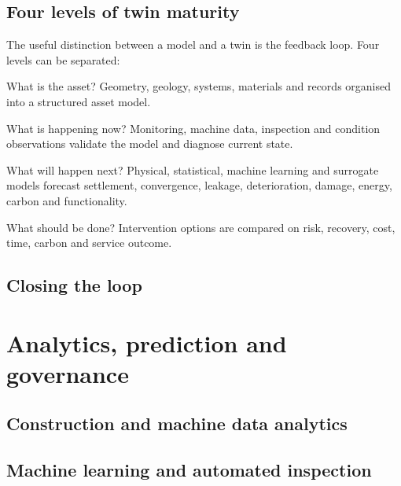 \subsection{Four levels of twin maturity}
\label{sec:twin-maturity}
The useful distinction between a model and a twin is the feedback loop. Four
levels can be separated:

\begin{description}[leftmargin=28mm,style=nextline,nosep]
  \item[Descriptive] What is the asset? Geometry, geology, systems, materials
    and records organised into a structured asset model.
  \item[Reflective] What is happening now? Monitoring, machine data, inspection
    and condition observations validate the model and diagnose current state.
  \item[Predictive] What will happen next? Physical, statistical, machine
    learning and surrogate models forecast settlement, convergence, leakage,
    deterioration, damage, energy, carbon and functionality.
  \item[Prescriptive] What should be done? Intervention options are compared on
    risk, recovery, cost, time, carbon and service outcome.
\end{description}

\subsection{Closing the loop}
\label{sec:twin-loop}

\section{Analytics, prediction and governance}
\label{sec:analytics-and-governance}

\subsection{Construction and machine data analytics}
\label{sec:tbm-analytics}

\subsection{Machine learning and automated inspection}
\label{sec:machine-learning}


